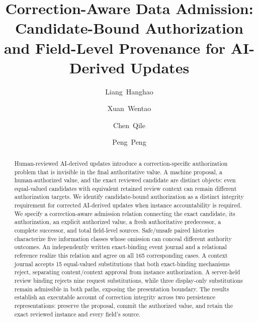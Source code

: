\documentclass[smallcondensed,natbib,nospthms]{svjour3}
\begin{document}
\title{Correction-Aware Data Admission: Candidate-Bound Authorization and Field-Level Provenance for AI-Derived Updates}
\author{\mbox{Liang Hanghao} \and \mbox{Xuan Wentao} \and \mbox{Chen Qile} \and \mbox{Peng Peng}}
\date{}
\maketitle
\begin{abstract}
Human-reviewed AI-derived updates introduce a correction-specific authorization problem that is invisible in the final authoritative value. A machine proposal, a human-authorized value, and the exact reviewed candidate are distinct objects: even equal-valued candidates with equivalent retained review context can remain different authorization targets. We identify candidate-bound authorization as a distinct integrity requirement for corrected AI-derived updates when instance accountability is required. We specify a correction-aware admission relation connecting the exact candidate, its authorization, an explicit authorized value, a fresh authoritative predecessor, a complete successor, and total field-level sources. Safe/unsafe paired histories characterize five information classes whose omission can conceal different authority outcomes. An independently written exact-binding event journal and a relational reference realize this relation and agree on all 165 corresponding cases. A context journal accepts 15 equal-valued substitutions that both exact-binding mechanisms reject, separating content/context approval from instance authorization. A server-held review binding rejects nine request substitutions, while three display-only substitutions remain admissible in both paths, exposing the presentation boundary. The results establish an executable account of correction integrity across two persistence representations: preserve the proposal, commit the authorized value, and retain the exact reviewed instance and every field's source.

\end{abstract}
















\end{document}
